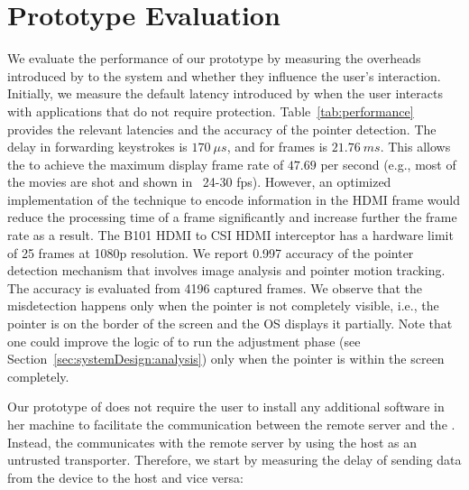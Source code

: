 \section{Prototype Evaluation}
\label{sec:eval}


We evaluate the performance of our prototype by measuring the overheads introduced by \name to the system and whether they influence the user's interaction. Initially, we measure the default latency introduced by \device when the user interacts with applications that do not require protection. Table~\ref{tab:performance} provides the relevant latencies and the accuracy of the pointer detection.
The delay in forwarding keystrokes is $170\ \mu s$, and for frames is $21.76\ ms$. This allows the \device to achieve the maximum display frame rate of $47.69$ per second (e.g., most of the movies are shot and shown in  ~24-30 fps). However, an optimized implementation of the technique to encode information in the HDMI frame would reduce the processing time of a frame significantly and increase further the frame rate as a result. The B101 HDMI to CSI HDMI interceptor has a hardware limit of 25 frames at 1080p resolution. We report 0.997 accuracy of the pointer detection mechanism that involves image analysis and pointer motion tracking. The accuracy is evaluated from 4196 captured frames.
We observe that the misdetection happens only when the pointer is not completely visible, i.e., the pointer is on the border of the screen and the OS displays it partially. Note that one could improve the logic of \device to run the adjustment phase (see Section~\ref{sec:systemDesign:analysis}) only when the pointer is within the screen completely.

Our prototype of \name does not require the user to install any additional software in her machine to facilitate the communication between the remote server and the \device. Instead, the \device communicates with the remote server by using the host as an untrusted transporter. Therefore, we start by measuring the delay of sending data from the device to the host and vice versa:

